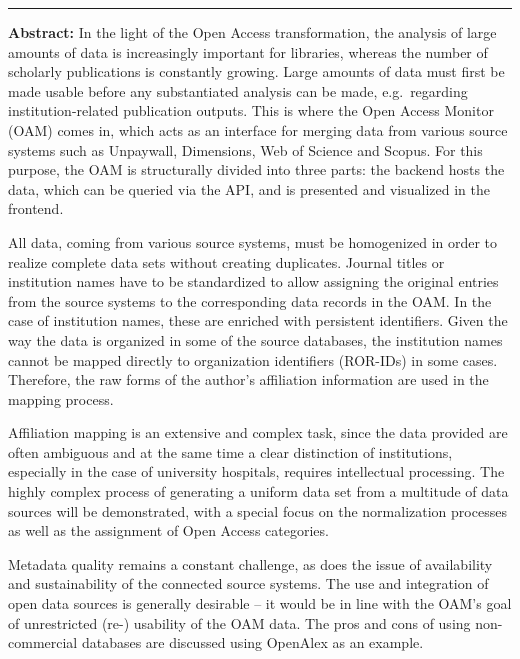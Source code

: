 \begin{center}\rule{0.5\linewidth}{0.5pt}\end{center}

\textbf{Abstract:} In the light of the Open Access transformation, the
analysis of large amounts of data is increasingly important for
libraries, whereas the number of scholarly publications is constantly
growing. Large amounts of data must first be made usable before any
substantiated analysis can be made, e.g.~regarding institution-related
publication outputs. This is where the Open Access Monitor (OAM) comes
in, which acts as an interface for merging data from various source
systems such as Unpaywall, Dimensions, Web of Science and Scopus. For
this purpose, the OAM is structurally divided into three parts: the
backend hosts the data, which can be queried via the API, and is
presented and visualized in the frontend.

All data, coming from various source systems, must be homogenized in
order to realize complete data sets without creating duplicates. Journal
titles or institution names have to be standardized to allow assigning
the original entries from the source systems to the corresponding data
records in the OAM. In the case of institution names, these are enriched
with persistent identifiers. Given the way the data is organized in some
of the source databases, the institution names cannot be mapped directly
to organization identifiers (ROR-IDs) in some cases. Therefore, the raw
forms of the author's affiliation information are used in the mapping
process.

Affiliation mapping is an extensive and complex task, since the data
provided are often ambiguous and at the same time a clear distinction of
institutions, especially in the case of university hospitals, requires
intellectual processing. The highly complex process of generating a
uniform data set from a multitude of data sources will be demonstrated,
with a special focus on the normalization processes as well as the
assignment of Open Access categories.

Metadata quality remains a constant challenge, as does the issue of
availability and sustainability of the connected source systems. The use
and integration of open data sources is generally desirable -- it would
be in line with the OAM's goal of unrestricted (re-) usability of the
OAM data. The pros and cons of using non-commercial databases are
discussed using OpenAlex as an example.
